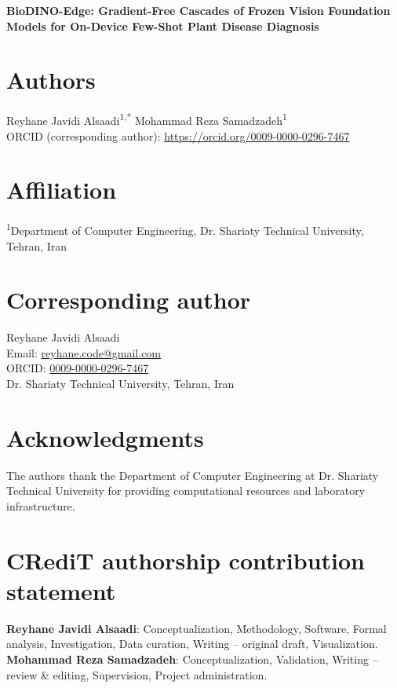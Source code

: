 \documentclass[12pt]{article}
\begin{document}
\begin{center}
{\Large\bfseries BioDINO-Edge: Gradient-Free Cascades of Frozen Vision Foundation Models for On-Device Few-Shot Plant Disease Diagnosis}
\end{center}

\vspace{1.5em}

\section*{Authors}
Reyhane Javidi Alsaadi\textsuperscript{1,*} \quad Mohammad Reza Samadzadeh\textsuperscript{1}\\
\small ORCID (corresponding author): \url{https://orcid.org/0009-0000-0296-7467}

\section*{Affiliation}
\textsuperscript{1}Department of Computer Engineering, Dr. Shariaty Technical University, Tehran, Iran

\section*{Corresponding author}
Reyhane Javidi Alsaadi\\
Email: \href{mailto:reyhane.code@gmail.com}{reyhane.code@gmail.com}\\
ORCID: \href{https://orcid.org/0009-0000-0296-7467}{0009-0000-0296-7467}\\
Dr. Shariaty Technical University, Tehran, Iran

\section*{Acknowledgments}
The authors thank the Department of Computer Engineering at Dr. Shariaty Technical University for providing computational resources and laboratory infrastructure.

\section*{CRediT authorship contribution statement}
\textbf{Reyhane Javidi Alsaadi}: Conceptualization, Methodology, Software, Formal analysis, Investigation, Data curation, Writing -- original draft, Visualization.\\
\textbf{Mohammad Reza Samadzadeh}: Conceptualization, Validation, Writing -- review \& editing, Supervision, Project administration.
\end{document}
